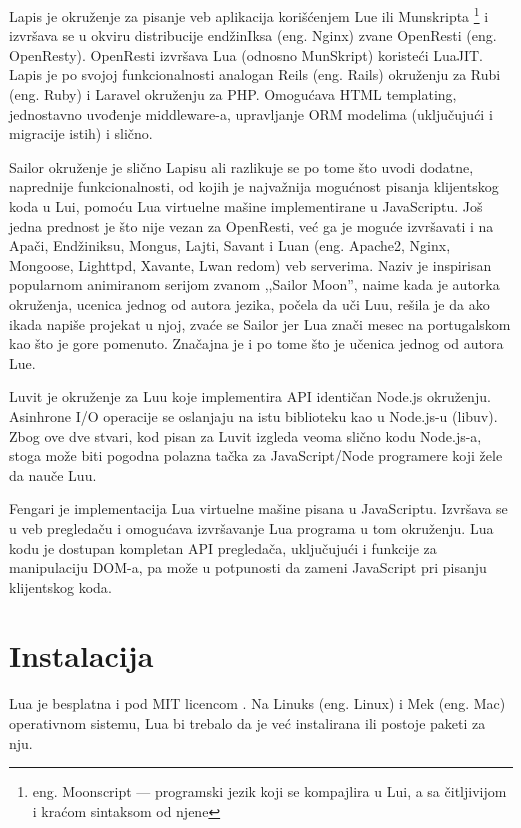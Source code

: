 \documentclass[a4paper]{article}
\begin{document}
Lapis je okruženje za pisanje veb aplikacija korišćenjem Lue ili Munskripta \footnote{eng. Moonscript --- programski jezik koji se kompajlira u Lui, a sa čitljivijom i kraćom sintaksom od njene} i izvršava se u okviru distribucije endžinIksa (eng. Nginx) zvane OpenResti (eng. OpenResty). OpenResti izvršava Lua (odnosno MunSkript) koristeći LuaJIT. Lapis je po svojoj funkcionalnosti analogan Reils (eng. Rails) okruženju za Rubi (eng. Ruby) i Laravel okruženju za PHP. Omogućava HTML templating, jednostavno uvođenje middleware-a, upravljanje ORM modelima (uključujući i migracije istih) i slično. 

Sailor okruženje je slično Lapisu ali razlikuje se po tome što uvodi dodatne, naprednije funkcionalnosti, od kojih je najvažnija mogućnost pisanja klijentskog koda u Lui, pomoću Lua virtuelne mašine implementirane u JavaScriptu. Još jedna prednost je što nije vezan za OpenResti, već ga je moguće izvršavati i na Apači, Endžiniksu, Mongus, Lajti, Savant i Luan (eng. Apache2, Nginx, Mongoose, Lighttpd, Xavante, Lwan redom) veb serverima. Naziv je inspirisan popularnom animiranom serijom zvanom ,,Sailor Moon'', naime kada je autorka okruženja, ucenica jednog od autora jezika, počela da uči Luu, rešila je da ako ikada napiše projekat u njoj, zvaće se Sailor jer Lua znači mesec na portugalskom kao što je gore pomenuto. Značajna je i po tome što je učenica jednog od autora Lue\cite{frameworkSailor}. 

Luvit je okruženje za Luu koje implementira API identičan Node.js okruženju. Asinhrone I/O operacije se oslanjaju na istu biblioteku kao u Node.js-u (libuv). Zbog ove dve stvari, kod pisan za Luvit izgleda veoma slično kodu Node.js-a, stoga može biti pogodna polazna tačka za JavaScript/Node programere koji žele da nauče Luu. 

Fengari je implementacija Lua virtuelne mašine pisana u JavaScriptu. Izvršava se u veb pregledaču i omogućava izvršavanje Lua programa u tom okruženju. Lua kodu je dostupan kompletan API pregledača, uključujući i funkcije za manipulaciju DOM-a, pa može u potpunosti da zameni JavaScript pri pisanju klijentskog koda\cite{frameworkFengari}.


\section{Instalacija}
\label{sec:instalacija}
  Lua je besplatna i pod MIT licencom %
. Na Linuks (eng. Linux) i Mek (eng. Mac) operativnom sistemu, Lua bi trebalo da je već instalirana ili postoje paketi za nju. 
\end{document}
